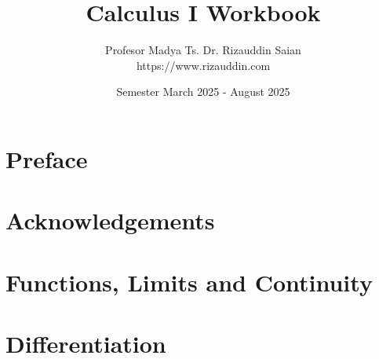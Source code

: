 \documentclass[12pt,a4paper,oneside]{report}
\title{Calculus I Workbook}
\author{Profesor Madya Ts. Dr. Rizauddin Saian\\
https://www.rizauddin.com
}
\date{Semester March 2025 - August 2025}
\begin{document}

%
%
%

\frontmatter

\maketitle

\ifincludesow
    
    
\fi

\chapter*{Preface}


\chapter*{Acknowledgements}


\tableofcontents

\mainmatter
\chapter{Functions, Limits and Continuity}
\makenewpage
\makenewpage
\makenewpage
\makenewpage
\makenewpage
\makenewpage
\makenewpage

\chapter{Differentiation}
\makenewpage
\makenewpage
\makenewpage
\makenewpage
\makenewpage
\makenewpage
\end{document}
